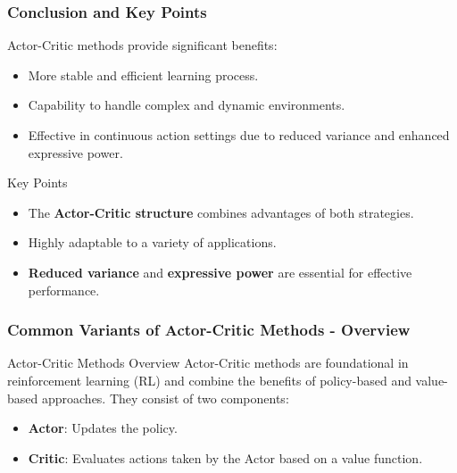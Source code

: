 \documentclass{beamer}
\begin{document}
\begin{frame}[fragile]
    \frametitle{Conclusion and Key Points}
    Actor-Critic methods provide significant benefits:
    \begin{itemize}
        \item More stable and efficient learning process.
        \item Capability to handle complex and dynamic environments.
        \item Effective in continuous action settings due to reduced variance and enhanced expressive power.
    \end{itemize}
    \begin{block}{Key Points}
        \begin{itemize}
            \item The \textbf{Actor-Critic structure} combines advantages of both strategies.
            \item Highly adaptable to a variety of applications.
            \item \textbf{Reduced variance} and \textbf{expressive power} are essential for effective performance.
        \end{itemize}
    \end{block}
\end{frame}

\begin{frame}[fragile]
    \frametitle{Common Variants of Actor-Critic Methods - Overview}
    \begin{block}{Actor-Critic Methods Overview}
        Actor-Critic methods are foundational in reinforcement learning (RL) and combine the benefits of policy-based and value-based approaches. They consist of two components:
        \begin{itemize}
            \item \textbf{Actor}: Updates the policy.
            \item \textbf{Critic}: Evaluates actions taken by the Actor based on a value function.
        \end{itemize}
    \end{block}
\end{frame}
\end{document}
